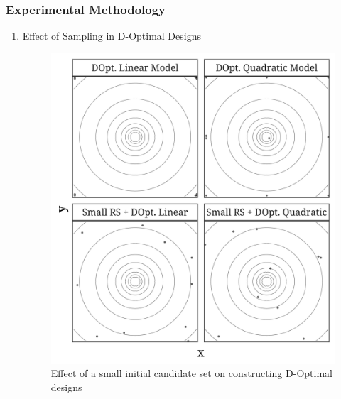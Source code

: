 \documentclass[conference]{IEEEtran}
\begin{document}
\subsubsection{Experimental Methodology}
\label{sec:org9a9c2ea}
\begin{enumerate}
\item Effect of Sampling in D-Optimal Designs
\label{sec:org88162fa}

\begin{center}
\begin{figure}[htbp]
\centering
\includegraphics[width=.75\columnwidth]{./img/dopt_comparison.pdf}
\caption{Effect of a small initial candidate set on constructing D-Optimal designs}
\end{figure}
\end{center}
\end{enumerate}
\end{document}
